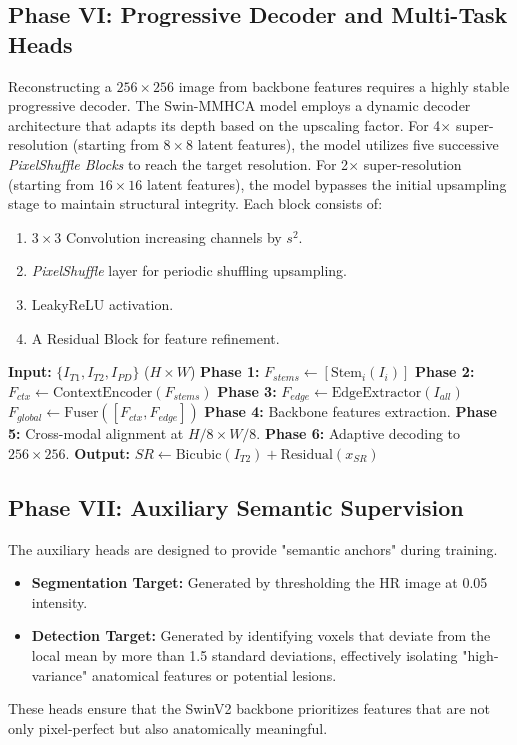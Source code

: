 \documentclass{IEEEoj}
\begin{document}
\subsection{Phase VI: Progressive Decoder and Multi-Task Heads}
Reconstructing a $256 \times 256$ image from backbone features requires a highly stable progressive decoder. The Swin-MMHCA model employs a dynamic decoder architecture that adapts its depth based on the upscaling factor. For 4$\times$ super-resolution (starting from $8 \times 8$ latent features), the model utilizes five successive \textit{PixelShuffle Blocks} to reach the target resolution. For 2$\times$ super-resolution (starting from $16 \times 16$ latent features), the model bypasses the initial upsampling stage to maintain structural integrity. Each block consists of:
\begin{enumerate}
    \item $3 \times 3$ Convolution increasing channels by $s^2$.
    \item \textit{PixelShuffle} layer for periodic shuffling upsampling.
    \item LeakyReLU activation.
    \item A Residual Block for feature refinement.
\end{enumerate}

\begin{algorithm}[h]
\caption{Swin-MMHCA Forward Pass}
\label{alg:forward}
\begin{algorithmic}[1]
\State \textbf{Input:} $\{I_{T1}, I_{T2}, I_{PD}\}$ ($H \times W$)
\State \textbf{Phase 1:} $F_{stems} \gets [\text{Stem}_i(I_i)]$
\State \textbf{Phase 2:} $F_{ctx} \gets \text{ContextEncoder}(F_{stems})$
\State \textbf{Phase 3:} $F_{edge} \gets \text{EdgeExtractor}(I_{all})$
\State $F_{global} \gets \text{Fuser}([F_{ctx}, F_{edge}])$
\State \textbf{Phase 4:} Backbone features extraction.
\State \textbf{Phase 5:} Cross-modal alignment at $H/8 \times W/8$.
\State \textbf{Phase 6:} Adaptive decoding to $256 \times 256$.
\State \textbf{Output:} $SR \gets \text{Bicubic}(I_{T2}) + \text{Residual}(x_{SR})$
\end{algorithmic}
\end{algorithm}

\subsection{Phase VII: Auxiliary Semantic Supervision}
The auxiliary heads are designed to provide "semantic anchors" during training.
\begin{itemize}
    \item \textbf{Segmentation Target:} Generated by thresholding the HR image at 0.05 intensity.
    \item \textbf{Detection Target:} Generated by identifying voxels that deviate from the local mean by more than 1.5 standard deviations, effectively isolating "high-variance" anatomical features or potential lesions.
\end{itemize}
These heads ensure that the SwinV2 backbone prioritizes features that are not only pixel-perfect but also anatomically meaningful.
\end{document}
